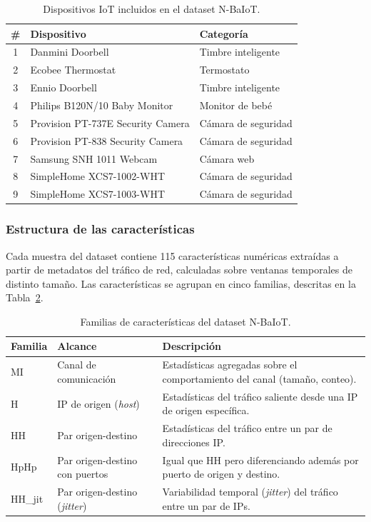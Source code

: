 \documentclass[11pt,a4paper]{article}
\begin{document}
\begin{table}[H]
\centering
\caption{Dispositivos IoT incluidos en el dataset N-BaIoT.}
\label{tab:dispositivos}
\small
\begin{tabularx}{\textwidth}{c l X}
\toprule
\textbf{\#} & \textbf{Dispositivo} & \textbf{Categoría} \\
\midrule
1 & Danmini Doorbell & Timbre inteligente \\
2 & Ecobee Thermostat & Termostato \\
3 & Ennio Doorbell & Timbre inteligente \\
4 & Philips B120N/10 Baby Monitor & Monitor de bebé \\
5 & Provision PT-737E Security Camera & Cámara de seguridad \\
6 & Provision PT-838 Security Camera & Cámara de seguridad \\
7 & Samsung SNH 1011 Webcam & Cámara web \\
8 & SimpleHome XCS7-1002-WHT & Cámara de seguridad \\
9 & SimpleHome XCS7-1003-WHT & Cámara de seguridad \\
\bottomrule
\end{tabularx}
\end{table}

\subsubsection{Estructura de las características}
Cada muestra del dataset contiene 115 características numéricas extraídas a partir de metadatos del tráfico de red, calculadas sobre ventanas temporales de distinto tamaño. Las características se agrupan en cinco familias, descritas en la Tabla~\ref{tab:features}.

\begin{table}[H]
\centering
\caption{Familias de características del dataset N-BaIoT.}
\label{tab:features}
\small
\begin{tabularx}{\textwidth}{p{2.0cm} p{3.8cm} X}
\toprule
\textbf{Familia} & \textbf{Alcance} & \textbf{Descripción} \\
\midrule
MI & Canal de comunicación & Estadísticas agregadas sobre el comportamiento del canal (tamaño, conteo). \\
H & IP de origen (\textit{host}) & Estadísticas del tráfico saliente desde una IP de origen específica. \\
HH & Par origen-destino & Estadísticas del tráfico entre un par de direcciones IP. \\
HpHp & Par origen-destino con puertos & Igual que HH pero diferenciando además por puerto de origen y destino. \\
HH\_jit & Par origen-destino (\textit{jitter}) & Variabilidad temporal (\textit{jitter}) del tráfico entre un par de IPs. \\
\bottomrule
\end{tabularx}
\end{table}
\end{document}
